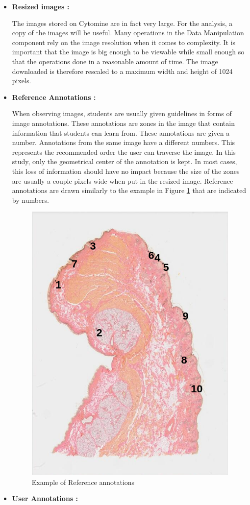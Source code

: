 \documentclass[a4paper,11pt]{report}
\numberwithin{figure}{section} %
\begin{document}
          \begin{itemize}
          \item[\textbullet] \textbf{Resized images :}\newline
          
          The images stored on Cytomine are in fact very large.
          For the analysis, a copy of the images will be useful.
          Many operations in the Data Manipulation component rely on the image resolution when it comes to complexity.
          It is important that the image is big enough to be viewable while small enough so that the operations done in a reasonable amount of time.
          The image downloaded is therefore rescaled to a maximum width and height of 1024 pixels.\\
          \item[\textbullet] \textbf{Reference Annotations :}\newline
          
          When observing images, students are usually given guidelines in forms of image annotations.
          These annotations are zones in the image that contain information that students can learn from.
          These annotations are given a number.
          Annotations from the same image have a different numbers.
          This represents the recommended order the user can traverse the image.
          In this study, only the geometrical center of the annotation is kept.
          In most cases, this loss of information should have no impact because the size of the zones are usually a couple pixels wide when put in the resized image.
          Reference annotations are drawn similarly to the example in Figure \ref{fig:annnn} that are indicated by numbers.\\
            \begin{figure}[H]
              \centering
              \includegraphics[width=.4\linewidth]{images/annotations.png}
              \caption{Example of Reference annotations}
              \label{fig:annnn}
            \end{figure}
		\item[\textbullet]  \textbf{User Annotations :}\newline
        

\end{itemize}
\end{document}
